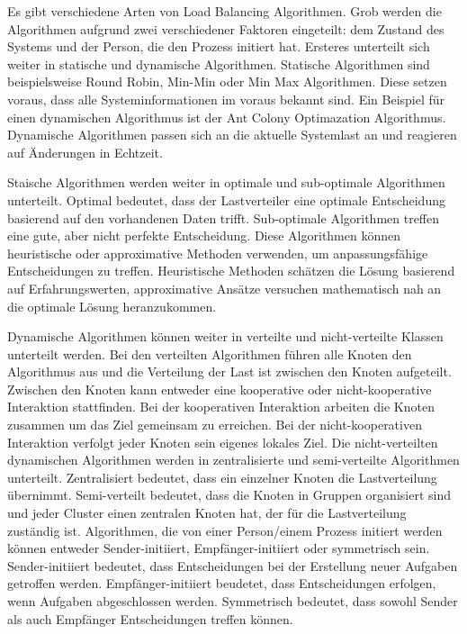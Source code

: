 \documentclass[a4paper,12pt]{article}
\begin{document}
Es gibt verschiedene Arten von Load Balancing Algorithmen. Grob werden die Algorithmen aufgrund zwei verschiedener Faktoren eingeteilt: dem Zustand des Systems und der Person, die den Prozess initiert hat. 
Ersteres unterteilt sich weiter in statische und dynamische Algorithmen. Statische Algorithmen sind beispielsweise Round Robin, Min-Min oder Min Max Algorithmen. Diese setzen voraus, dass alle Systeminformationen im voraus bekannt sind. Ein Beispiel für einen dynamischen Algorithmus ist der Ant Colony Optimazation Algorithmus. Dynamische Algorithmen passen sich an die aktuelle Systemlast an und reagieren auf Änderungen in Echtzeit. 

Staische Algorithmen werden weiter in optimale und sub-optimale Algorithmen unterteilt. Optimal bedeutet, dass der Lastverteiler eine optimale Entscheidung basierend auf den vorhandenen Daten trifft. Sub-optimale Algorithmen treffen eine gute, aber nicht perfekte Entscheidung. Diese Algorithmen können heuristische oder approximative Methoden verwenden, um anpassungsfähige Entscheidungen zu treffen. Heuristische Methoden schätzen die Lösung basierend auf Erfahrungswerten, approximative Ansätze versuchen mathematisch nah an die optimale Lösung heranzukommen. 

Dynamische Algorithmen können weiter in verteilte und nicht-verteilte Klassen unterteilt werden. Bei den verteilten Algorithmen führen alle Knoten den Algorithmus aus und die Verteilung der Last ist zwischen den Knoten aufgeteilt. Zwischen den Knoten kann entweder eine kooperative oder nicht-kooperative Interaktion stattfinden. Bei der kooperativen Interaktion arbeiten die Knoten zusammen um das Ziel gemeinsam zu erreichen. Bei der nicht-kooperativen Interaktion verfolgt jeder Knoten sein eigenes lokales Ziel. Die nicht-verteilten dynamischen Algorithmen werden in zentralisierte und semi-verteilte Algorithmen unterteilt. Zentralisiert bedeutet, dass ein einzelner Knoten die Lastverteilung übernimmt. Semi-verteilt bedeutet, dass die Knoten in Gruppen organisiert sind und jeder Cluster einen zentralen Knoten hat, der für die Lastverteilung zuständig ist. 
\newline
Algorithmen, die von einer Person/einem Prozess initiert werden können entweder Sender-initiiert, Empfänger-initiiert oder symmetrisch sein.
Sender-initiiert bedeutet, dass Entscheidungen bei der Erstellung neuer Aufgaben getroffen werden. Empfänger-initiiert beudetet, dass Entscheidungen erfolgen, wenn Aufgaben abgeschlossen werden. Symmetrisch bedeutet, dass sowohl Sender als auch Empfänger Entscheidungen treffen können. \cite[S. 3]{LoadBalancing}
\end{document}
